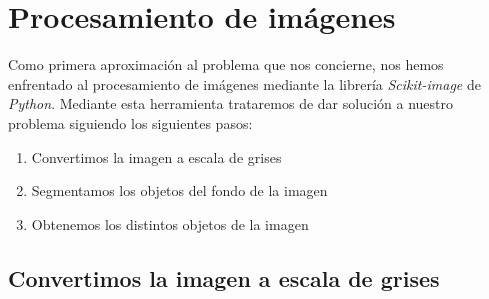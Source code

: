 
\begin{comment}
Este apartado pretende recoger los aspectos más interesantes del desarrollo del proyecto, comentados por los autores del mismo.
Debe incluir desde la exposición del ciclo de vida utilizado, hasta los detalles de mayor relevancia de las fases de análisis, diseño e implementación.
Se busca que no sea una mera operación de copiar y pegar diagramas y extractos del código fuente, sino que realmente se justifiquen los caminos de solución que se han tomado, especialmente aquellos que no sean triviales.
Puede ser el lugar más adecuado para documentar los aspectos más interesantes del diseño y de la implementación, con un mayor hincapié en aspectos tales como el tipo de arquitectura elegido, los índices de las tablas de la base de datos, normalización y desnormalización, distribución en ficheros3, reglas de negocio dentro de las bases de datos (EDVHV GH GDWRV DFWLYDV), aspectos de desarrollo relacionados con el WWW...
Este apartado, debe convertirse en el resumen de la experiencia práctica del proyecto, y por sí mismo justifica que la memoria se convierta en un documento útil, fuente de referencia para los autores, los tutores y futuros alumnos.
\end{comment}

\section{Procesamiento de imágenes}

Como primera aproximación al problema que nos concierne, nos hemos enfrentado al procesamiento de imágenes mediante la librería \textit{Scikit-image} de \textit{Python}. Mediante esta herramienta trataremos de dar solución a nuestro problema siguiendo los siguientes pasos:

\begin{enumerate}[1.]
  \item Convertimos la imagen a escala de grises
  \item Segmentamos los objetos del fondo de la imagen
  \item Obtenemos los distintos objetos de la imagen
\end{enumerate}

\subsection{Convertimos la imagen a escala de grises}

